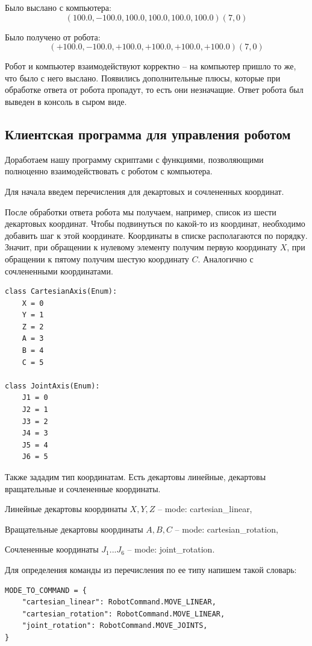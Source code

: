 \documentclass[a4paper,14pt]{extarticle}
\begin{document}
Было выслано с компьютера:
$$
\left( 100.0, -100.0, 100.0, 100.0, 100.0, 100.0\right)\left( 7,0 \right)
$$


Было получено от робота:
$$
\left( +100.0, -100.0, +100.0, +100.0, +100.0, +100.0\right)\left( 7,0 \right)
$$


Робот и компьютер взаимодействуют корректно -- на компьютер пришло то же,
что было с него выслано. Появились дополнительные плюсы, которые при
обработке ответа от робота пропадут, то есть они незначащие. Ответ
робота был выведен в консоль в сыром виде.


\subsection{Клиентская программа для управления роботом}
Доработаем нашу программу скриптами с функциями,
позволяющими полноценно взаимодействовать
с роботом с компьютера.


Для начала введем перечисления для декартовых и сочлененных координат.


После обработки ответа робота мы получаем, например, список из шести
декартовых координат. Чтобы подвинуться по какой-то из координат,
необходимо добавить шаг к этой координате. Координаты в списке
располагаются по порядку. Значит, при обращении к нулевому элементу
получим первую координату $X$, при обращении к пятому получим шестую координату $C$.
Аналогично с сочлененными координатами.
\begin{lstlisting}[label=lst:coords, caption={Определение перечислений, где каждой координате соответствует свой индекс в списке.}]
class CartesianAxis(Enum):
    X = 0
    Y = 1
    Z = 2
    A = 3
    B = 4
    C = 5

class JointAxis(Enum):
    J1 = 0
    J2 = 1
    J3 = 2
    J4 = 3
    J5 = 4
    J6 = 5
\end{lstlisting}


Также зададим тип координатам. Есть декартовы линейные, декартовы вращательные и сочлененные координаты.
\begin{compactitem}
    \item Линейные декартовы координаты $X,Y,Z$ -- mode: cartesian\_linear,
    \item Вращательные декартовы координаты $A,B,C$ -- mode: cartesian\_rotation,
    \item Сочлененные координаты $J_1...J_6$ -- mode: joint\_rotation.
\end{compactitem}


Для определения команды из перечисления по ее типу напишем такой словарь:
\begin{lstlisting}[label=lst:md2cmd, caption={Словарь для приведения типа координаты к команде из перечисления.}]
MODE_TO_COMMAND = {
    "cartesian_linear": RobotCommand.MOVE_LINEAR,
    "cartesian_rotation": RobotCommand.MOVE_LINEAR,
    "joint_rotation": RobotCommand.MOVE_JOINTS,
} 
\end{lstlisting}
\end{document}

